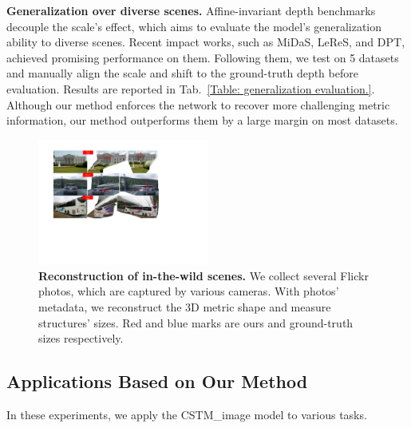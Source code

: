 \noindent\textbf{Generalization over diverse scenes.}
Affine-invariant depth benchmarks decouple the scale's effect, which aims to evaluate the model's generalization ability to diverse scenes. Recent impact works, such as MiDaS, LeReS, and DPT, achieved promising performance on them. Following them, we test on 5 datasets and manually align the scale and shift to the ground-truth depth before evaluation. Results are reported in Tab.~\ref{Table: generalization evaluation.}. Although our method enforces the network to recover more challenging metric information, our method outperforms them by a large margin on most datasets. 



\begin{figure}[!bth]
\centering
\includegraphics[width=0.5\textwidth]{./files/metrology_in_the_wild.pdf}
\vspace{-2 em}
\caption{\textbf{Reconstruction of in-the-wild scenes.} We collect several Flickr photos, which are captured by various cameras. With photos' metadata, we reconstruct the 3D metric shape and measure structures' sizes. Red and blue marks are ours and ground-truth sizes respectively. }
\label{fig: reconstruction in the wild.}
\vspace{-1em}
\end{figure}


\subsection{Applications Based on Our Method}
In these experiments, we apply the CSTM\_image model to various tasks. 

